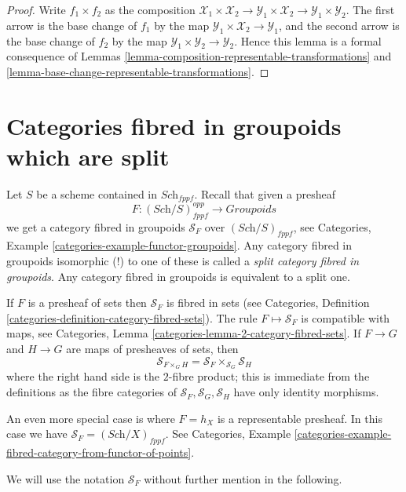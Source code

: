 \begin{proof}
Write $f_1 \times f_2$ as the composition
$\mathcal{X}_1 \times \mathcal{X}_2 \to
\mathcal{Y}_1 \times \mathcal{X}_2 \to
\mathcal{Y}_1 \times \mathcal{Y}_2$.
The first arrow is the base change of $f_1$ by the map
$\mathcal{Y}_1 \times \mathcal{X}_2 \to \mathcal{Y}_1$, and the second arrow
is the base change of $f_2$ by the map
$\mathcal{Y}_1 \times \mathcal{Y}_2 \to \mathcal{Y}_2$.
Hence this lemma is a formal
consequence of Lemmas \ref{lemma-composition-representable-transformations}
and \ref{lemma-base-change-representable-transformations}.
\end{proof}



\section{Categories fibred in groupoids which are split}
\label{section-split}

\noindent
Let $S$ be a scheme contained in $\textit{Sch}_{fppf}$.
Recall that given a presheaf
$$
F : (\textit{Sch}/S)_{fppf}^{opp} \longrightarrow \textit{Groupoids}
$$
we get a category fibred in groupoids $\mathcal{S}_F$ over
$(\textit{Sch}/S)_{fppf}$, see
Categories, Example \ref{categories-example-functor-groupoids}.
Any category fibred in groupoids isomorphic (!) to one of these
is called a {\it split category fibred in groupoids}.
Any category fibred in groupoids is equivalent to a split one.

\medskip\noindent
If $F$ is a presheaf of sets then $\mathcal{S}_F$ is
fibred in sets (see
Categories,
Definition \ref{categories-definition-category-fibred-sets}).
The rule $F \mapsto \mathcal{S}_F$ is compatible with maps, see
Categories, Lemma \ref{categories-lemma-2-category-fibred-sets}.
If $F \to G$ and $H \to G$ are maps of presheaves of sets, then
$$
\mathcal{S}_{F \times_G H} =
\mathcal{S}_F \times_{\mathcal{S}_G} \mathcal{S}_H
$$
where the right hand side is the $2$-fibre product; this is immediate
from the definitions as the fibre categories of
$\mathcal{S}_F, \mathcal{S}_G, \mathcal{S}_H$ have only identity morphisms.

\medskip\noindent
An even more special case is where $F = h_X$ is a representable
presheaf. In this case we have $\mathcal{S}_F = (\textit{Sch}/X)_{fppf}$. See
Categories,
Example \ref{categories-example-fibred-category-from-functor-of-points}.

\medskip\noindent
We will use the notation $\mathcal{S}_F$ without further mention in the
following.




